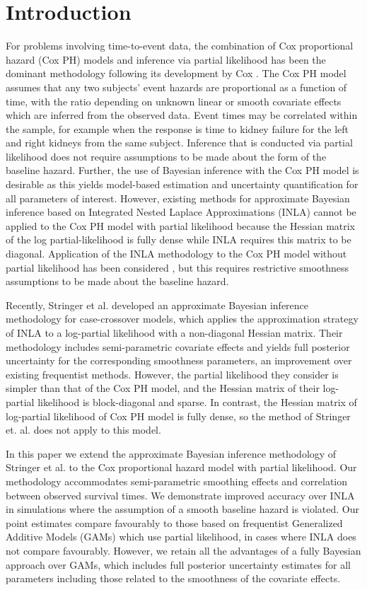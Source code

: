 \documentclass[serif,10pt]{wiley-article}
\begin{document}
\section{Introduction}\label{sec1}
For problems involving time-to-event data, the combination of Cox proportional hazard (Cox PH) models and inference via partial likelihood has been the dominant methodology following its development by Cox \cite{coxph}. The Cox PH model assumes that any two subjects' event hazards are proportional as a function of time, with the ratio depending on unknown linear or smooth covariate effects which are inferred from the observed data. Event times may be correlated within the sample, for example when the response is time to kidney failure for the left and right kidneys from the same subject. Inference that is conducted via partial likelihood does not require assumptions to be made about the form of the baseline hazard. Further, the use of Bayesian inference with the Cox PH model is desirable as this yields model-based estimation and uncertainty quantification for all parameters of interest. However, existing methods for approximate Bayesian inference based on Integrated Nested Laplace Approximations (INLA) \cite{inla} cannot be applied to the Cox PH model with partial likelihood because the Hessian matrix of the log partial-likelihood is fully dense while INLA requires this matrix to be diagonal. Application of the INLA methodology to the Cox PH model without partial likelihood has been considered \cite{inlacoxph}, but this requires restrictive smoothness assumptions to be made about the baseline hazard.

Recently, Stringer et al. \cite{casecross} developed an approximate Bayesian inference methodology for case-crossover models, which applies the approximation strategy of INLA to a log-partial likelihood with a non-diagonal Hessian matrix. Their methodology includes semi-parametric covariate effects and yields full posterior uncertainty for the corresponding smoothness parameters, an improvement over existing frequentist methods. However, the partial likelihood they consider is simpler than that of the Cox PH model, and the Hessian matrix of their log-partial likelihood is block-diagonal and sparse. In contrast, the Hessian matrix of log-partial likelihood of Cox PH model is fully dense, so the method of Stringer et. al. \cite{casecross} does not apply to this model.

In this paper we extend the approximate Bayesian inference methodology of Stringer et al. \cite{casecross} to the Cox proportional hazard model with partial likelihood. Our methodology accommodates semi-parametric smoothing effects and correlation between observed survival times. We demonstrate improved accuracy over INLA in simulations where the assumption of a smooth baseline hazard is violated. Our point estimates compare favourably to those based on frequentist Generalized Additive Models (GAMs) which use partial likelihood, in cases where INLA does not compare favourably. However, we retain all the advantages of a fully Bayesian approach over GAMs, which includes full posterior uncertainty estimates for all parameters including those related to the smoothness of the covariate effects.
\end{document}
